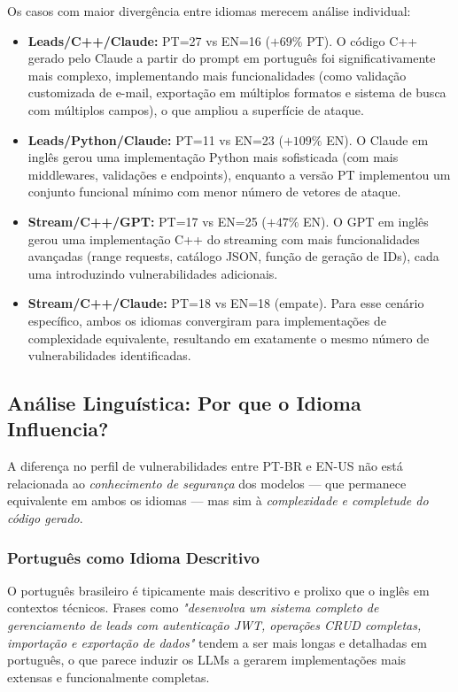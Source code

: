 \documentclass[12pt]{article}
\begin{document}
Os casos com maior divergência entre idiomas merecem análise individual:

\begin{itemize}
  \item \textbf{Leads/C++/Claude:} PT=27 vs EN=16 ($+69\%$ PT). O código C++ gerado pelo Claude a partir do prompt em português foi significativamente mais complexo, implementando mais funcionalidades (como validação customizada de e-mail, exportação em múltiplos formatos e sistema de busca com múltiplos campos), o que ampliou a superfície de ataque.
  \item \textbf{Leads/Python/Claude:} PT=11 vs EN=23 ($+109\%$ EN). O Claude em inglês gerou uma implementação Python mais sofisticada (com mais middlewares, validações e endpoints), enquanto a versão PT implementou um conjunto funcional mínimo com menor número de vetores de ataque.
  \item \textbf{Stream/C++/GPT:} PT=17 vs EN=25 ($+47\%$ EN). O GPT em inglês gerou uma implementação C++ do streaming com mais funcionalidades avançadas (range requests, catálogo JSON, função de geração de IDs), cada uma introduzindo vulnerabilidades adicionais.
  \item \textbf{Stream/C++/Claude:} PT=18 vs EN=18 (empate). Para esse cenário específico, ambos os idiomas convergiram para implementações de complexidade equivalente, resultando em exatamente o mesmo número de vulnerabilidades identificadas.
\end{itemize}

\subsection{Análise Linguística: Por que o Idioma Influencia?}

A diferença no perfil de vulnerabilidades entre PT-BR e EN-US não está relacionada ao \textit{conhecimento de segurança} dos modelos — que permanece equivalente em ambos os idiomas — mas sim à \textit{complexidade e completude do código gerado}.

\subsubsection{Português como Idioma Descritivo}

O português brasileiro é tipicamente mais descritivo e prolixo que o inglês em contextos técnicos. Frases como \textit{"desenvolva um sistema completo de gerenciamento de leads com autenticação JWT, operações CRUD completas, importação e exportação de dados"} tendem a ser mais longas e detalhadas em português, o que parece induzir os LLMs a gerarem implementações mais extensas e funcionalmente completas.
\end{document}
